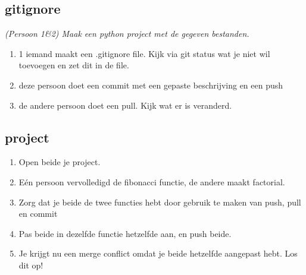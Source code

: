 \documentclass[a4paper, titlepage]{article}
\begin{document}
		\subsection{gitignore}
			\emph{(Persoon 1\&2) Maak een python project met de gegeven bestanden.}
			
			\begin{enumerate}
				\item 1 iemand maakt een .gitignore file. Kijk via git status wat je niet wil toevoegen en zet dit in de file. 
				\item deze persoon doet een commit met een gepaste beschrijving en een push
				\item de andere persoon doet een pull. Kijk wat er is veranderd.
			\end{enumerate}
		\subsection{project}
			\begin{enumerate}
				\item Open beide je project.
				\item Eén persoon vervolledigd de fibonacci functie, de andere maakt factorial.
				\item Zorg dat je beide de twee functies hebt door gebruik te maken van push, pull en commit
				
				\item Pas beide in dezelfde functie hetzelfde aan, en push beide.
				\item Je krijgt nu een merge conflict omdat je beide hetzelfde aangepast hebt. Los dit op!		
			\end{enumerate}			
\end{document}
